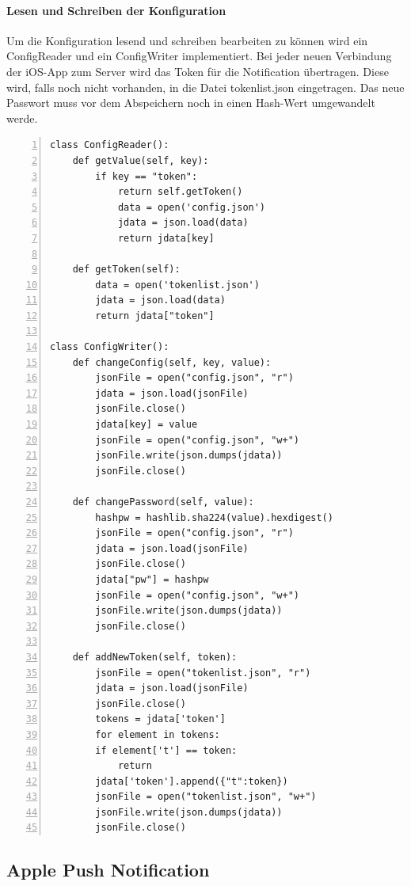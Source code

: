 \paragraph{Lesen und Schreiben der Konfiguration}  Um die Konfiguration lesend und schreiben bearbeiten zu können wird ein ConfigReader und ein ConfigWriter implementiert. Bei jeder neuen Verbindung der iOS-App zum Server wird das Token für die Notification übertragen. Diese wird, falls noch nicht vorhanden, in die Datei tokenlist.json eingetragen. Das neue Passwort muss vor dem Abspeichern noch in einen Hash-Wert umgewandelt werde. 
\begin{lstlisting}[caption=ConfigReader / ConfigWriter, language=xml, frame=single, breaklines=true,columns=fullflexible, commentstyle=\color{gray}\upshape, captionpos=b, numbers = left]
class ConfigReader():
	def getValue(self, key):
		if key == "token":
			return self.getToken()
			data = open('config.json')
			jdata = json.load(data)
			return jdata[key]

	def getToken(self):
		data = open('tokenlist.json')
		jdata = json.load(data)
		return jdata["token"]

class ConfigWriter():
	def changeConfig(self, key, value):
		jsonFile = open("config.json", "r")
		jdata = json.load(jsonFile)
		jsonFile.close()
		jdata[key] = value
		jsonFile = open("config.json", "w+")
		jsonFile.write(json.dumps(jdata))
		jsonFile.close()

	def changePassword(self, value):
		hashpw = hashlib.sha224(value).hexdigest()
		jsonFile = open("config.json", "r")
		jdata = json.load(jsonFile)
		jsonFile.close()
		jdata["pw"] = hashpw
		jsonFile = open("config.json", "w+")
		jsonFile.write(json.dumps(jdata))
		jsonFile.close()
		
	def addNewToken(self, token):
		jsonFile = open("tokenlist.json", "r")
		jdata = json.load(jsonFile)
		jsonFile.close()
		tokens = jdata['token']
		for element in tokens:
		if element['t'] == token:
			return
		jdata['token'].append({"t":token})
		jsonFile = open("tokenlist.json", "w+")
		jsonFile.write(json.dumps(jdata))
		jsonFile.close()
\end{lstlisting}

\subsection{Apple Push Notification} 
